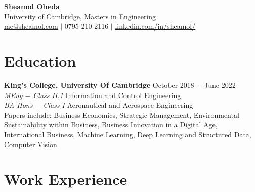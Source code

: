 \documentclass{article}
\begin{document}
\begin{center}

\LARGE \textbf{Sheamol Obeda\\}
\Large {\color{DarkSlateBlue} University of Cambridge, Masters in Engineering}\\
\normalsize \href{mailto: me@sheamol.com}{me@sheamol.com} $\mid$ 0795 210 2116 $\mid$ \href{https://www.linkedin.com/in/sheamol/}{linkedin.com/in/sheamol/}\\
\vspace{-.75\baselineskip}
\hrulefill
\vspace{-.75\baselineskip}
\end{center}

\section*{Education}

\textbf{King's College, University Of Cambridge}  \hfill October 2018 $-$ June 2022\\
\textit{MEng $-$ Class II.1} Information and Control Engineering\\
\textit{BA Hons $-$ Class I} Aeronautical and Aerospace Engineering \\
Papers include: Business Economics, Strategic Management, Environmental Sustainability within Business, Business Innovation in a Digital Age, International Business, Machine Learning, Deep Learning and Structured Data, Computer Vision
\medskip



\vspace{-0.75\baselineskip}
\hrulefill
\vspace{-0.75\baselineskip}

\section*{Work Experience}
\end{document}
